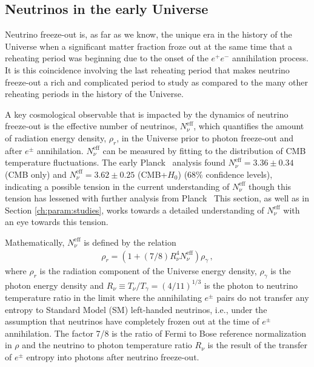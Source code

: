 \subsection{Neutrinos in the early Universe}
\label{sec:model:ind}

Neutrino freeze-out is, as far as we know, the unique era in the history of the Universe when a significant matter fraction froze out at the same time that a reheating period was beginning due to the onset of the $e^+e^-$ annihilation process. It is this coincidence involving the last reheating period that makes neutrino freeze-out a rich and complicated period to study as compared to the many other reheating periods in the history of the Universe.

A key cosmological observable that is impacted by the dynamics of neutrino freeze-out is the effective number of neutrinos, $N^{\text{eff}}_\nu$, which quantifies the amount of radiation energy density, $\rho_r$, in the Universe prior to photon freeze-out and after $e^\pm$ annihilation. $N^{\text{eff}}_\nu$  can be measured by fitting to the distribution of CMB temperature fluctuations. The early Planck~\cite{Planck:2013pxb} analysis found $N^{\text{eff}}_{\nu}=3.36\pm 0.34$ (CMB only) and $N^{\text{eff}}_{\nu}=3.62\pm 0.25$ (CMB+$H_0$) ($68\%$ confidence levels), indicating a possible tension in the current understanding of $N^{\text{eff}}_\nu$ though this tension has lessened with further analysis from Planck~\cite{Planck:2015fie,Planck:2018vyg} This section, as well as in Section \ref{ch:param:studies}, works towards a detailed understanding of $N^{\text{eff}}_{\nu}$ with an eye towards this tension.

Mathematically, $N^{\text{eff}}_\nu$ is defined by the relation
\begin{align}\label{eq:NeffDef}
\rho_r=\left(1+(7/8)R_\nu^{4}N^{\text{eff}}_\nu\right)\rho_\gamma\,,
\end{align}
where $\rho_r$ is the radiation component of the Universe energy density, $\rho_\gamma$ is the photon energy density and $R_\nu\equiv T_\nu/T_\gamma=({4}/{11})^{1/3}$ is the photon to neutrino temperature ratio in the limit where the annihilating $e^\pm$ pairs do not transfer any entropy to Standard Model (SM) left-handed neutrinos, i.e., under the assumption that neutrinos have completely frozen out at the time of $e^\pm$ annihilation. The factor 7/8 is the ratio of Fermi to Bose reference normalization in $\rho$ and the neutrino to photon temperature ratio $R_\nu$ is the result of the transfer of $e^\pm$ entropy into photons after neutrino freeze-out. 

